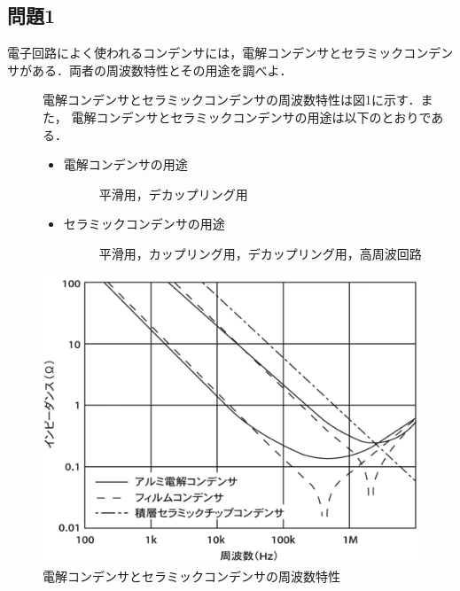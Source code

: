 \subsection*{問題1}
電子回路によく使われるコンデンサには，電解コンデンサとセラミックコンデン
サがある．両者の周波数特性とその用途を調べよ．
\begin{description}
    \item[] 電解コンデンサとセラミックコンデンサの周波数特性は図1に示す．また，
    電解コンデンサとセラミックコンデンサの用途は以下のとおりである．
    \begin{itemize}
        \item 電解コンデンサの用途
        \begin{description}
            \item[] 平滑用，デカップリング用
        \end{description}
        \item セラミックコンデンサの用途
        \begin{description}
            \item[] 平滑用，カップリング用，デカップリング用，高周波回路
        \end{description}
    \end{itemize}
\end{description}

\begin{figure}[H]
    \centering
    \includegraphics[scale=0.4]{figure1.pdf}
    \caption{電解コンデンサとセラミックコンデンサの周波数特性}
\end{figure}

